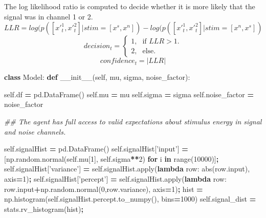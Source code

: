 \documentclass[12pt,twoside]{reedthesis}
\newenvironment{Shaded}{\begin{snugshade}}{\end{snugshade}}
\newcommand{\BuiltInTok}[1]{#1}
\newcommand{\CommentTok}[1]{\textcolor[rgb]{0.56,0.35,0.01}{\textit{#1}}}
\newcommand{\ControlFlowTok}[1]{\textcolor[rgb]{0.13,0.29,0.53}{\textbf{#1}}}
\newcommand{\DecValTok}[1]{\textcolor[rgb]{0.00,0.00,0.81}{#1}}
\newcommand{\FunctionTok}[1]{\textcolor[rgb]{0.00,0.00,0.00}{#1}}
\newcommand{\KeywordTok}[1]{\textcolor[rgb]{0.13,0.29,0.53}{\textbf{#1}}}
\newcommand{\NormalTok}[1]{#1}
\newcommand{\OperatorTok}[1]{\textcolor[rgb]{0.81,0.36,0.00}{\textbf{#1}}}
\newcommand{\StringTok}[1]{\textcolor[rgb]{0.31,0.60,0.02}{#1}}
\newcommand{\VariableTok}[1]{\textcolor[rgb]{0.00,0.00,0.00}{#1}}
\begin{document}
The log likelihood ratio is computed to decide whether it is more likely that the signal was in channel 1 or 2.
\begin{equation}
LLR=log(p([x'^1_t,x'^2_t]|stim=[x^s,x^n])-log(p([x'^1_t,x'^2_t]|stim=[x^n,x^s])
\end{equation}
\begin{equation}
  decision_t=\begin{cases}
    \text{1}, & \text{if } LLR>1.\\
   \text{2}, & \text{else}.
    
  \end{cases}
\end{equation}
\begin{equation}
confidence_t = |LLR|
\end{equation}
\begin{Shaded}
\begin{Highlighting}[]

\KeywordTok{class}\NormalTok{ Model:}
    \KeywordTok{def} \FunctionTok{__init__}\NormalTok{(}\VariableTok{self}\NormalTok{, mu, sigma, noise_factor):}
        
        \VariableTok{self}\NormalTok{.df }\OperatorTok{=}\NormalTok{ pd.DataFrame()}
        \VariableTok{self}\NormalTok{.mu }\OperatorTok{=}\NormalTok{ mu}
        \VariableTok{self}\NormalTok{.sigma }\OperatorTok{=}\NormalTok{ sigma}
        \VariableTok{self}\NormalTok{.noise_factor }\OperatorTok{=}\NormalTok{ noise_factor}
        
      \CommentTok{## The agent has full access to valid expectations about stimulus energy in signal and noise channels.}
        
        \VariableTok{self}\NormalTok{.signalHist }\OperatorTok{=}\NormalTok{ pd.DataFrame()}
        \VariableTok{self}\NormalTok{.signalHist[}\StringTok{'input'}\NormalTok{] }\OperatorTok{=}\NormalTok{ [np.random.normal(}\VariableTok{self}\NormalTok{.mu[}\DecValTok{1}\NormalTok{], }\VariableTok{self}\NormalTok{.sigma}\OperatorTok{**}\DecValTok{2}\NormalTok{) }\ControlFlowTok{for}\NormalTok{ i }\KeywordTok{in} \BuiltInTok{range}\NormalTok{(}\DecValTok{10000}\NormalTok{)]}\OperatorTok{;}
        \VariableTok{self}\NormalTok{.signalHist[}\StringTok{'variance'}\NormalTok{] }\OperatorTok{=} \VariableTok{self}\NormalTok{.signalHist.}\BuiltInTok{apply}\NormalTok{(}\KeywordTok{lambda}\NormalTok{ row: }\BuiltInTok{abs}\NormalTok{(row.}\BuiltInTok{input}\NormalTok{), axis}\OperatorTok{=}\DecValTok{1}\NormalTok{)}\OperatorTok{;}
        \VariableTok{self}\NormalTok{.signalHist[}\StringTok{'percept'}\NormalTok{] }\OperatorTok{=} \VariableTok{self}\NormalTok{.signalHist.}\BuiltInTok{apply}\NormalTok{(}\KeywordTok{lambda}\NormalTok{ row: row.}\BuiltInTok{input}\OperatorTok{+}\NormalTok{np.random.normal(}\DecValTok{0}\NormalTok{,row.variance), axis}\OperatorTok{=}\DecValTok{1}\NormalTok{)}\OperatorTok{;}
\NormalTok{        hist }\OperatorTok{=}\NormalTok{ np.histogram(}\VariableTok{self}\NormalTok{.signalHist.percept.to_numpy(), bins}\OperatorTok{=}\DecValTok{1000}\NormalTok{)}
        \VariableTok{self}\NormalTok{.signal_dist }\OperatorTok{=}\NormalTok{ stats.rv_histogram(hist)}\OperatorTok{;}
        

\end{Highlighting}
\end{Shaded}
\end{document}
